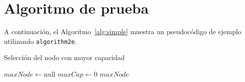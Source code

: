\section{Algoritmo de prueba}

A continuación, el Algoritmo~\ref{alg:simple} muestra un pseudocódigo de ejemplo utilizando \texttt{algorithm2e}.

\begin{algorithm}[H]
\caption{Selección del nodo con mayor capacidad}
\label{alg:simple}
\SetAlgoLined
{}
$maxNode \gets \text{null}$\;
$maxCap \gets 0$\;
\Return $maxNode$\;
\end{algorithm}
